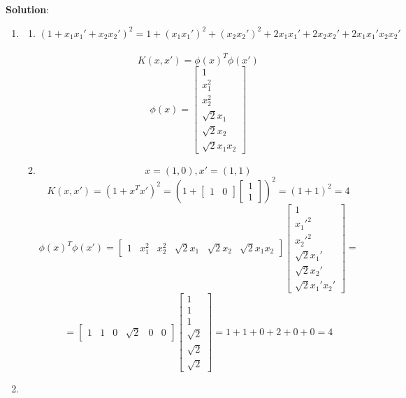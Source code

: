 \documentclass[submit]{../harvardml}
\newenvironment{solution}{
    \vspace{2mm}
    \color{blue}\noindent\textbf{Solution}:
}{}
\begin{document}
\begin{solution}
	\begin{enumerate}
	    \item \begin{enumerate}
	        \item $$(1 + x_1 x_1' + x_2 x_2')^2 = 1 + (x_1x_1')^2 + (x_2x_2')^2 + 2x_1x_1' + 2x_2x_2' + 2x_1x_1'x_2x_2'$$\\
            $$K(x, x') = \phi(x)^T\phi(x')$$
            $$\phi(x) = \begin{bmatrix} 1 \\ x_1^2 \\ x_2^2 \\ \sqrt{2}x_1 \\ \sqrt{2}x_2 \\ \sqrt{2}x_1x_2 \end{bmatrix}$$
            \item $$x = (1,0), x' = (1, 1)$$ 
            $$K(x, x') = (1 + x^Tx')^2 = (1 + \begin{bmatrix} 1 & 0  \end{bmatrix} \begin{bmatrix} 1\\ 1  \end{bmatrix})^2 = (1 +1)^2 = 4$$
            $$\phi(x)^T\phi(x') = \begin{bmatrix} 1 & x_1^2 & x_2^2 & \sqrt{2}x_1 & \sqrt{2}x_2 & \sqrt{2}x_1x_2 \end{bmatrix}\begin{bmatrix} 1 \\ x_1'^2 \\ x_2'^2 \\ \sqrt{2}x_1' \\ \sqrt{2}x_2' \\ \sqrt{2}x_1'x_2' \end{bmatrix} = $$ $$= \begin{bmatrix} 1 & 1 & 0 & \sqrt{2} & 0 & 0 \end{bmatrix} \begin{bmatrix} 1 \\ 1 \\ 1 \\ \sqrt{2} \\ \sqrt{2} \\ \sqrt{2} \end{bmatrix} = 1 + 1 + 0  + 2 + 0 + 0 = 4$$
	    \end{enumerate}
        \item \begin{enumerate}

\end{enumerate}
\end{enumerate}
\end{solution}
\end{document}

